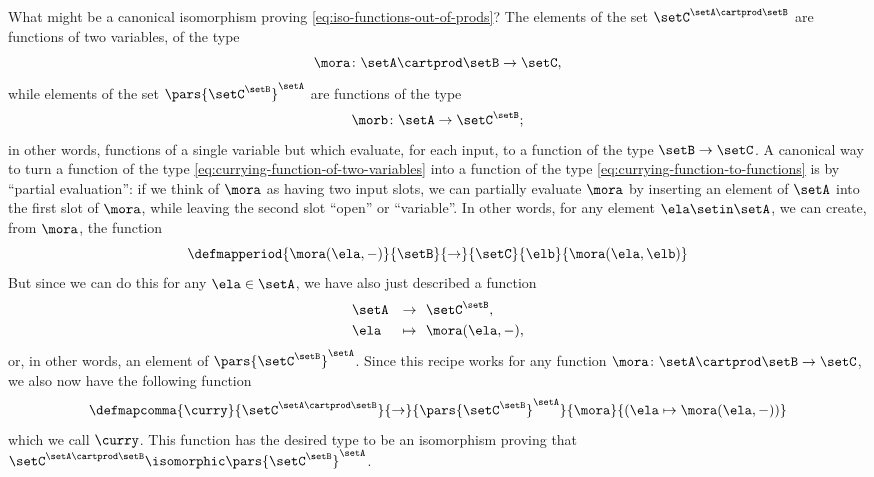 What might be a canonical isomorphism proving \cref{eq:iso-functions-out-of-prods}? The elements of the set $ \setC^{\setA \cartprod \setB}$ are functions of two variables, of the type
\begin{equation}\label{eq:currying-function-of-two-variables}
    \mora \colon \setA \cartprod \setB \to \setC,
\end{equation}
while elements of the set $\pars{\setC^\setB}^\setA$ are functions of the type
\begin{equation} \label{eq:currying-function-to-functions}
    \morb \colon \setA \to \setC^\setB;
\end{equation}
in other words, functions of a single variable but which evaluate, for each input, to a function of the type $\setB \to \setC$.
A canonical way to turn a function of the type \cref{eq:currying-function-of-two-variables} into a function of the type \cref{eq:currying-function-to-functions} is by ``partial evaluation'': if we think of $\mora$ as having two input slots, we can partially evaluate $\mora$ by inserting an element of $\setA$ into the first slot of $\mora$, while leaving the second slot ``open'' or ``variable''.
In other words, for any element $\ela \setin \setA$, we can create, from $\mora$, the function
\begin{equation}
    \defmapperiod{
        \mora(\ela, -)
    }{
        \setB
    }{
        \to
    }{
        \setC
    }{
        \elb
    }{
        \mora (\ela, \elb)
    }
\end{equation}
But since we can do this for any $\ela \in \setA$, we have also just described a function
\begin{equation}
    \begin{aligned}
         & \setA & \to     & \ \ \setC^\setB, \\
         & \ela  & \mapsto & \ \  \mora ( \ela, -),
    \end{aligned}
\end{equation}
or, in other words, an element of $\pars{\setC^\setB}^\setA$. Since this recipe works for any function $\mora \colon \setA \cartprod \setB \to \setC$, we also now have the following function
\begin{equation}\label{eq:right-curry-function}
    \defmapcomma{
        \curry
    }{
        \setC^{\setA \cartprod \setB}
    }{
        \to
    }{
        \pars{\setC^\setB}^\setA
    }{
        \mora
    }{
        (\ela \mapsto \mora ( \ela, -))
    }
\end{equation}
which we call $\curry$.
This function has the desired type to be an isomorphism proving that $\setC^{\setA \cartprod \setB} \isomorphic \pars{\setC^\setB}^\setA$.

